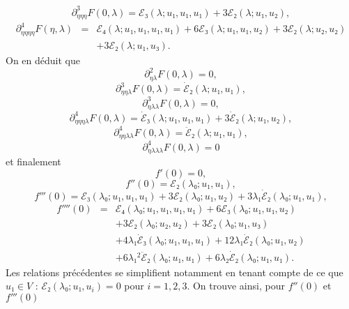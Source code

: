 \documentclass[12pt, final]{amsart}
\theoremstyle{definition}
\begin{document}
\begin{equation} \partial_{η  η  η}^3 F(0, λ) =ℰ₃
  (λ ; u₁, u₁, u₁) + 3ℰ₂(λ ; u₁, u₂), \end{equation}
\begin{eqnarray}
  \partial_{η  η  η  η}^4 F(η,
  λ) & = & ℰ₄(λ ; u₁, u₁, u₁, u₁) + 6ℰ₃
 (λ ; u₁, u₁, u₂) + 3ℰ₂(λ ; u₂, u₂) \nonumber\\
  &  &  + 3ℰ₂(λ ; u₁, u₃) . \nonumber
\end{eqnarray}
On en déduit que
\begin{equation} \partial_{η  λ}^2 F(0, λ) = 0, \end{equation}
\begin{equation} \partial_{η  η  λ}^3 F(0, λ) =
   \dot{ℰ}₂(λ ; u₁, u₁), \end{equation}
\begin{equation} \partial_{η  λ  λ}^3 F(0, λ) = 0, \end{equation}
\begin{equation} \partial_{η  η  η  λ}^4 F(0,
   λ) = \dot{ℰ}₃(λ ; u₁, u₁, u₁) + 3
   \dot{ℰ}₂(λ ; u₁, u₂), \text{} \text{} \end{equation}
\begin{equation} \partial_{η  η  λ  λ}^4 F(0,
   λ) = \ddot{ℰ}₂(λ ; u₁, u₁), \end{equation}
\begin{equation} \partial_{η  λ  λ  λ}^4 F(0,
   λ) = 0 \end{equation}
et finalement
\begin{equation} f'(0) = 0, \end{equation}
\begin{equation} f''(0) =ℰ₂(λ₀ ; u₁, u₁), \end{equation}
\begin{equation} f'''(0) =ℰ₃(λ₀ ; u₁, u₁, u₁) + 3ℰ₂
  (λ₀ ; u₁, u₂) + 3 λ₁  \dot{ℰ}₂(λ₀ ; u₁,
   u₁), \end{equation}
\begin{eqnarray}
  f''''(0) & = & ℰ₄(λ₀ ; u₁, u₁, u₁, u₁) +
  6ℰ₃(λ₀ ; u₁, u₁, u₂) \nonumber\\
  &  &  + 3ℰ₂(λ₀ ; u₂, u₂) + 3ℰ₂
 (λ₀ ; u₁, u₃) \nonumber\\
  &  &  + 4 λ₁  \dot{ℰ}₃(λ₀ ; u₁, u₁,
  u₁) + 12 λ₁  \dot{ℰ}₂(λ₀ ; u₁, u₂) \nonumber\\
  &  &  + 6 λ₁^2  \ddot{ℰ}₂(λ₀ ; u₁, u₁)
  + 6 λ₂  \dot{ℰ}₂(λ₀ ; u₁, u₁) . \nonumber
\end{eqnarray}
Les relations précédentes se simplifient notamment en tenant compte de ce que \(u₁∈V\) : \(ℰ₂(λ₀ ; u₁, u_i) = 0\) pour \(i = 1, 2, 3\). On trouve ainsi, pour \(f''(0)\) et \(f'''(0)\)
\end{document}
